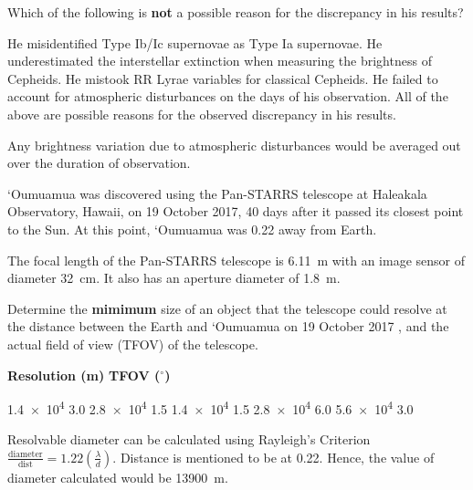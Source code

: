 \documentclass[a4paper,11pt]{exam}
\begin{document}
\begin{questions}
	Which of the following is \textbf{not} a possible reason for the discrepancy in his results?
	\begin{choices}
		\choice	He misidentified Type Ib/Ic supernovae as Type Ia supernovae.
		\choice	He underestimated the interstellar extinction when measuring the brightness of Cepheids.
		\choice	He mistook RR Lyrae variables for classical Cepheids.
		\correctchoice	He failed to account for atmospheric disturbances on the days of his observation.
		\choice	All of the above are possible reasons for the observed discrepancy in his results.
	\end{choices}
	\begin{solution}
		Any brightness variation due to atmospheric disturbances would be averaged out over the duration of observation.
	\end{solution}

\filbreak
\question
	`Oumuamua was discovered using the Pan-STARRS telescope at Haleakala Observatory, Hawaii, on 19 October 2017, 40 days after it passed its closest point to the Sun. At this point,  `Oumuamua was \SI{0.22}{\AU} away from Earth.

	The focal length of the Pan-STARRS telescope is \SI{6.11}{\metre} with an image sensor of diameter \SI{32}{\centi\metre}. It also has an aperture diameter of \SI{1.8}{\metre}.

	Determine the \textbf{mimimum} size of an object that the telescope could resolve at the distance between the Earth and `Oumuamua on 19 October 2017 , and the actual field of view (TFOV) of the telescope.

	\hspace{21pt} \textbf{Resolution (m)} \hspace{30pt} \textbf{TFOV ($ ^{\circ} $)}
	\begin{choices}
		\correctchoice \hspace{10pt} \num{1.4e4} \hspace{60pt} 3.0
		\choice \hspace{10pt} \num{2.8e4} \hspace{60pt} 1.5
		\choice \hspace{10pt} \num{1.4e4} \hspace{60pt} 1.5
		\choice \hspace{10pt} \num{2.8e4} \hspace{60pt} 6.0
		\choice \hspace{10pt} \num{5.6e4} \hspace{60pt} 3.0
	\end{choices}
	\begin{solution}
		Resolvable diameter can be calculated using Rayleigh’s Criterion $\frac{\text{diameter}}{\text{dist}} = 1.22\left(\frac{\lambda}{d}\right)$. Distance is mentioned to be at \SI{0.22}{\AU}. Hence, the value of diameter calculated would be \SI{13900}{\metre}.


\end{solution}
\end{questions}
\end{document}
